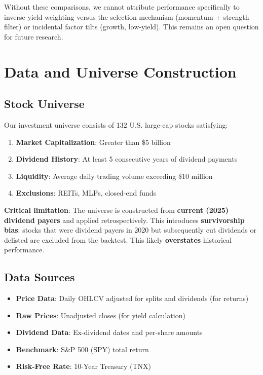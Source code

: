 \documentclass[12pt,a4paper]{article}
\theoremstyle{definition}
\begin{document}
Without these comparisons, we cannot attribute performance specifically to inverse yield weighting versus the selection mechanism (momentum + strength filter) or incidental factor tilts (growth, low-yield). This remains an open question for future research.

\section{Data and Universe Construction}
\label{sec:data}

\subsection{Stock Universe}

Our investment universe consists of 132 U.S. large-cap stocks satisfying:

\begin{enumerate}
    \item \textbf{Market Capitalization}: Greater than \$5 billion
    \item \textbf{Dividend History}: At least 5 consecutive years of dividend payments
    \item \textbf{Liquidity}: Average daily trading volume exceeding \$10 million
    \item \textbf{Exclusions}: REITs, MLPs, closed-end funds
\end{enumerate}

\textbf{Critical limitation}: The universe is constructed from \textbf{current (2025) dividend payers} and applied retrospectively. This introduces \textbf{survivorship bias}: stocks that were dividend payers in 2020 but subsequently cut dividends or delisted are excluded from the backtest. This likely \textbf{overstates} historical performance.

\subsection{Data Sources}

\begin{itemize}
    \item \textbf{Price Data}: Daily OHLCV adjusted for splits and dividends (for returns)
    \item \textbf{Raw Prices}: Unadjusted closes (for yield calculation)
    \item \textbf{Dividend Data}: Ex-dividend dates and per-share amounts
    \item \textbf{Benchmark}: S\&P 500 (SPY) total return
    \item \textbf{Risk-Free Rate}: 10-Year Treasury (TNX)
\end{itemize}
\end{document}
